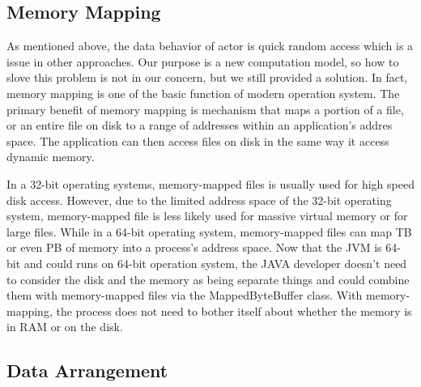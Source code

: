 \documentclass[twocolumn,a4paper,10pt]{article}
\begin{document}
\subsection{Memory Mapping}

As mentioned above, the data behavior of actor is quick random access which is a issue in other approaches. Our purpose is a new computation model, so how to slove this problem is not in our concern, but we still provided a solution. In fact, memory mapping is one of the basic function of modern operation system. The primary benefit of memory mapping is mechanism that maps a portion of a file, or an entire file on disk to a range of addresses within an application's addres space. The application can then access files on disk in the same way it access dynamic memory.\newline

In a 32-bit operating systems, memory-mapped files is usually used for high speed disk access. However, due to the limited address space of the 32-bit operating system, memory-mapped file is less likely used for massive virtual memory or for large files. While in a 64-bit operating system, memory-mapped files can map TB or even PB of memory into a process’s address space. Now that the JVM is 64-bit and could runs on 64-bit operation system, the JAVA developer doesn’t need to consider the disk and the memory as being separate things and could combine them with memory-mapped files via the MappedByteBuffer class. With memory-mapping, the process does not need to bother itself about whether the memory is in RAM or on the disk. \newline

\subsection{Data Arrangement}
\end{document}
